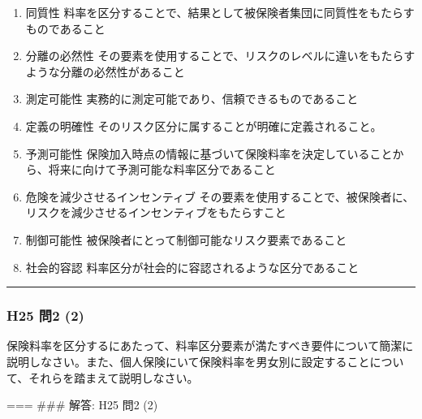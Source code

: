 \documentclass[]{article}
\begin{document}
\begin{enumerate}
\def\labelenumi{\arabic{enumi}.}
\tightlist
\item
  同質性
  料率を区分することで、結果として被保険者集団に同質性をもたらすものであること
\item
  分離の必然性
  その要素を使用することで、リスクのレベルに違いをもたらすような分離の必然性があること
\item
  測定可能性 実務的に測定可能であり、信頼できるものであること
\item
  定義の明確性 そのリスク区分に属することが明確に定義されること。
\item
  予測可能性
  保険加入時点の情報に基づいて保険料率を決定していることから、将来に向けて予測可能な料率区分であること
\item
  危険を減少させるインセンティブ
  その要素を使用することで、被保険者に、リスクを減少させるインセンティブをもたらすこと
\item
  制御可能性 被保険者にとって制御可能なリスク要素であること
\item
  社会的容認 料率区分が社会的に容認されるような区分であること
\end{enumerate}

\begin{center}\rule{0.5\linewidth}{0.5pt}\end{center}

\hypertarget{h25-ux554f2-2}{%
\subsubsection{H25 問2 (2)}\label{h25-ux554f2-2}}

保険料率を区分するにあたって、料率区分要素が満たすべき要件について簡潔に説明しなさい。また、個人保険にいて保険料率を男女別に設定することについて、それらを踏まえて説明しなさい。

=== \#\#\# 解答: H25 問2 (2)
\end{document}
